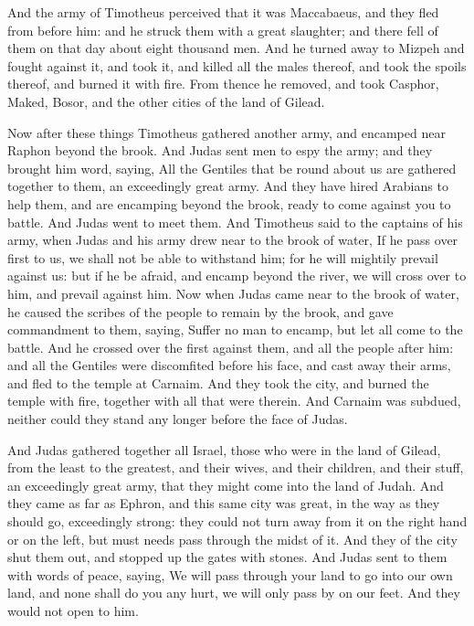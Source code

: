 {And the army of Timotheus perceived that it was Maccabaeus, and they fled from before him: and he struck them with a great slaughter; and there fell of them on that day about eight thousand men.
And he turned away to Mizpeh and fought against it, and took it, and killed all the males thereof, and took the spoils thereof, and burned it with fire.
From thence he removed, and took
 Casphor, Maked, Bosor, and the other cities of the land of Gilead.
\par }{\PP {}Now after these things Timotheus gathered another army, and encamped near Raphon beyond the brook.
And Judas sent men to espy the army; and they brought him word, saying, All the Gentiles that be round about us are gathered together to them, an exceedingly great army.
And they have hired Arabians to help them, and are encamping beyond the brook, ready to come against you to battle. And Judas went to meet them.
And Timotheus said to the captains of his army, when Judas and his army drew near to the brook of water, If he pass over first to us, we shall not be able to withstand him; for he will mightily prevail against us:
but if he be afraid, and encamp beyond the river, we will cross over to him, and prevail against him.
Now when Judas came near to the brook of water, he caused the scribes of the people to remain by the brook, and gave commandment to them, saying, Suffer no man to encamp, but let all come to the battle.
And he crossed over the first against them, and all the people after him: and all the Gentiles were discomfited before his face, and cast away their arms, and fled to the temple at
 Carnaim.
And they took the city, and burned the temple with fire, together with all that were therein. And Carnaim was subdued, neither could they stand any longer before the face of Judas.
\par }{\PP {}And Judas gathered together all Israel, those who were in the land of Gilead, from the least to the greatest, and their wives, and their children, and their stuff, an exceedingly great army, that they might come into the land of Judah.
And they came as far as Ephron, and this same city was great,
{} in the way as they should go, exceedingly strong: they could not turn away from it on the right hand or on the left, but must needs pass through the midst of it.
And they of the city shut them out, and stopped up the gates with stones.
And Judas sent to them with words of peace, saying, We will pass through your land to go into our own land, and none shall do you any hurt, we will only pass by on our feet. And they would not open to him.
}
